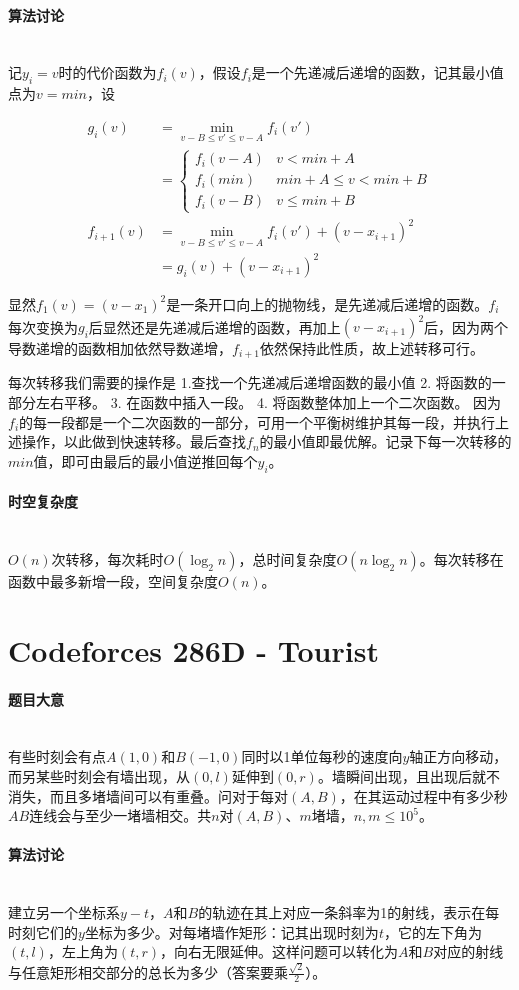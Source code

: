 \documentclass[UTF8]{ctexart}
\newcommand{\myparagraph}[1]{\paragraph{#1}\mbox{}\\}
\theoremstyle{nonumberplain}
\begin{document}
		\myparagraph{算法讨论}
			
			记$y_i=v$时的代价函数为$f_i(v)$，假设$f_i$是一个先递减后递增的函数，记其最小值点为$v=min$，设
			
			$$\begin{aligned}
				g_i(v)&=\min_{v-B \leq v' \leq v-A}f_i(v')\\
				      &=\begin{cases}
				           f_i(v-A) & v < min+A \\
						   f_i(min) & min+A \leq v < min+B \\
						   f_i(v-B) & v \leq min+B
						\end{cases} \\
				f_{i+1}(v)&=\min_{v-B \leq v' \leq v-A}f_i(v')+(v-x_{i+1})^2 \\
				          &=g_i(v)+(v-x_{i+1})^2
			\end{aligned}$$
			
			显然$f_1(v)=(v-x_1)^2$是一条开口向上的抛物线，是先递减后递增的函数。$f_i$每次变换为$g_i$后显然还是先递减后递增的函数，再加上$(v-x_{i+1})^2$后，因为两个导数递增的函数相加依然导数递增，$f_{i+1}$依然保持此性质，故上述转移可行。
			
			每次转移我们需要的操作是 1.查找一个先递减后递增函数的最小值 2. 将函数的一部分左右平移。 3. 在函数中插入一段。 4. 将函数整体加上一个二次函数。 因为$f_i$的每一段都是一个二次函数的一部分，可用一个平衡树维护其每一段，并执行上述操作，以此做到快速转移。最后查找$f_n$的最小值即最优解。记录下每一次转移的$min$值，即可由最后的最小值逆推回每个$y_i$。
			
		\myparagraph{时空复杂度}
		
			$O(n)$次转移，每次耗时$O(\log_2n)$，总时间复杂度$O(n\log_2n)$。每次转移在函数中最多新增一段，空间复杂度$O(n)$。
	
	\section{Codeforces 286D - Tourist}
	
		\myparagraph{题目大意}
		
			有些时刻会有点$A(1,0)$和$B(-1,0)$同时以1单位每秒的速度向$y$轴正方向移动，而另某些时刻会有墙出现，从$(0,l)$延伸到$(0,r)$。墙瞬间出现，且出现后就不消失，而且多堵墙间可以有重叠。问对于每对$(A,B)$，在其运动过程中有多少秒$AB$连线会与至少一堵墙相交。共$n$对$(A,B)$、$m$堵墙，$n,m \leq 10^5$。
		
		\myparagraph{算法讨论}
		
			建立另一个坐标系$y-t$，$A$和$B$的轨迹在其上对应一条斜率为1的射线，表示在每时刻它们的$y$坐标为多少。对每堵墙作矩形：记其出现时刻为$t$，它的左下角为$(t,l)$，左上角为$(t,r)$，向右无限延伸。这样问题可以转化为$A$和$B$对应的射线与任意矩形相交部分的总长为多少（答案要乘$\frac{\sqrt{2}}{2}$）。
			
\end{document}
